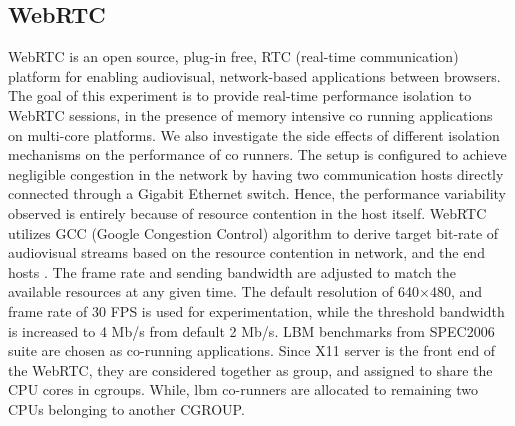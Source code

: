 \documentclass[times, 10pt,onecolumn]{article}
\begin{document}
\subsection{WebRTC}
WebRTC is an open source, plug-in free, RTC (real-time communication)
platform for enabling audiovisual, network-based applications between
browsers. The goal of this experiment is to provide real-time
performance isolation to WebRTC sessions, in the presence of memory
intensive co running applications on multi-core platforms. We also
investigate the side effects of different isolation mechanisms on the
performance of co runners. The setup is configured to achieve
negligible congestion in the network by having two communication hosts
directly connected through a Gigabit Ethernet switch. Hence, the
performance variability observed is entirely because of resource
contention in the host itself. WebRTC utilizes GCC (Google Congestion
Control) algorithm to derive target bit-rate of audiovisual streams
based on the resource contention in network, and the end hosts
\cite{ccm2013webrtc}. The frame rate and sending bandwidth are
adjusted to match the available resources at any given time. The
default resolution of 640$\times$480, and frame rate of 30 FPS is used
for experimentation, while the threshold bandwidth is increased to 4
Mb/s from default 2 Mb/s. LBM benchmarks from SPEC2006 suite are
chosen as co-running applications. Since X11 server is the front end
of the WebRTC, they are considered together as group, and assigned to
share the CPU cores in cgroups. While, lbm co-runners are allocated to
remaining two CPUs belonging to another CGROUP.
\end{document}
